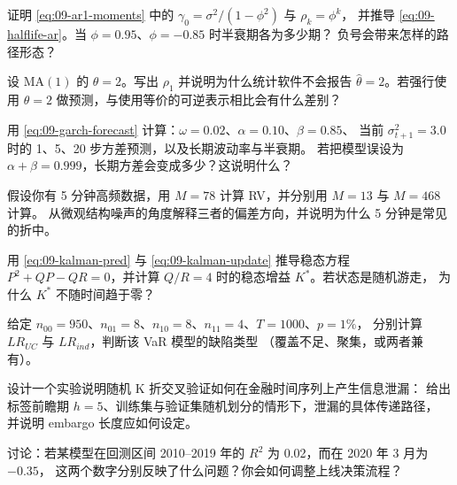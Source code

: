 \begin{exercises}
  \item 证明 \cref{eq:09-ar1-moments} 中的 $\gamma_0=\sigma^2/(1-\phi^2)$ 与 $\rho_k=\phi^k$，
  并推导 \cref{eq:09-halflife-ar}。当 $\phi=0.95$、$\phi=-0.85$ 时半衰期各为多少期？
  负号会带来怎样的路径形态？
  \item 设 $\mathrm{MA}(1)$ 的 $\theta=2$。写出 $\rho_1$ 并说明为什么统计软件不会报告
  $\hat\theta=2$。若强行使用 $\theta=2$ 做预测，与使用等价的可逆表示相比会有什么差别？
  \item 用 \cref{eq:09-garch-forecast} 计算：$\omega=0.02$、$\alpha=0.10$、$\beta=0.85$、
  当前 $\sigma_{t+1}^2=3.0$ 时的 1、5、20 步方差预测，以及长期波动率与半衰期。
  若把模型误设为 $\alpha+\beta=0.999$，长期方差会变成多少？这说明什么？
  \item 假设你有 5 分钟高频数据，用 $M=78$ 计算 RV，并分别用 $M=13$ 与 $M=468$ 计算。
  从微观结构噪声的角度解释三者的偏差方向，并说明为什么 5 分钟是常见的折中。
  \item 用 \cref{eq:09-kalman-pred} 与 \cref{eq:09-kalman-update} 推导稳态方程
  $P^2+QP-QR=0$，并计算 $Q/R=4$ 时的稳态增益 $K^\ast$。若状态是随机游走，
  为什么 $K^\ast$ 不随时间趋于零？
  \item 给定 $n_{00}=950$、$n_{01}=8$、$n_{10}=8$、$n_{11}=4$、$T=1000$、$p=1\%$，
  分别计算 $LR_{UC}$ 与 $LR_{ind}$，判断该 VaR 模型的缺陷类型
  （覆盖不足、聚集，或两者兼有）。
  \item 设计一个实验说明随机 K 折交叉验证如何在金融时间序列上产生信息泄漏：
  给出标签前瞻期 $h=5$、训练集与验证集随机划分的情形下，泄漏的具体传递路径，
  并说明 embargo 长度应如何设定。
  \item 讨论：若某模型在回测区间 2010--2019 年的 $R^2$ 为 0.02，而在 2020 年 3 月为 $-0.35$，
  这两个数字分别反映了什么问题？你会如何调整上线决策流程？
\end{exercises}

